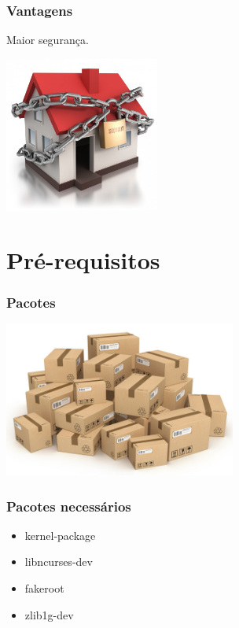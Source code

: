 \documentclass{beamer}
\begin{document}
\begin{frame}
  \frametitle{Vantagens}
   Maior segurança.\\
   \begin{center}
   \includegraphics[height = 2in, width = 2in]{images/security.jpeg}
   \end{center}
\end{frame}

\section{Pré-requisitos}

\begin{frame}
 \frametitle{Pacotes}
 \begin{center}
  \includegraphics[height = 2in, width = 3in]{images/packages.jpg}
 \end{center}

\end{frame}

\begin{frame}
  \frametitle{Pacotes necessários}
  
  \begin{itemize}
   \item kernel-package
    \pause
   \item libncurses-dev
    \pause
   \item fakeroot
    \pause
   \item zlib1g-dev
  \end{itemize}

\end{frame}
\end{document}
